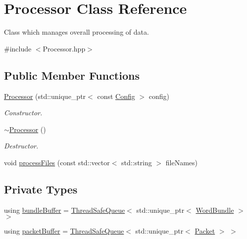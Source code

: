 \hypertarget{class_processor}{}\section{Processor Class Reference}
\label{class_processor}


Class which manages overall processing of data.  




{\ttfamily \#include $<$Processor.\+hpp$>$}

\subsection*{Public Member Functions}
\begin{DoxyCompactItemize}
\item 
\hyperlink{class_processor_a1cc4421ebb02f40665336598c1334c55}{Processor} (std\+::unique\+\_\+ptr$<$ const \hyperlink{class_config}{Config} $>$ config)
\begin{DoxyCompactList}\small\item\em Constructor. \end{DoxyCompactList}\item 
\hyperlink{class_processor_acf37952c5b420d4e903a512571678692}{$\sim$\+Processor} ()
\begin{DoxyCompactList}\small\item\em Destructor. \end{DoxyCompactList}\item 
void \hyperlink{class_processor_a4186d391ddee1f68d763931dad346c4a}{process\+Files} (const std\+::vector$<$ std\+::string $>$ file\+Names)
\end{DoxyCompactItemize}
\subsection*{Private Types}
\begin{DoxyCompactItemize}
\item 
using \hyperlink{class_processor_a531b4c5f7c0d810fc6e9e1dd3d115725}{bundle\+Buffer} = \hyperlink{class_thread_safe_queue}{Thread\+Safe\+Queue}$<$ std\+::unique\+\_\+ptr$<$ \hyperlink{class_word_bundle}{Word\+Bundle} $>$ $>$
\item 
using \hyperlink{class_processor_a0cfd8ed0721769db91c142a19a392e0f}{packet\+Buffer} = \hyperlink{class_thread_safe_queue}{Thread\+Safe\+Queue}$<$ std\+::unique\+\_\+ptr$<$ \hyperlink{class_packet}{Packet} $>$ $>$
\end{DoxyCompactItemize}
